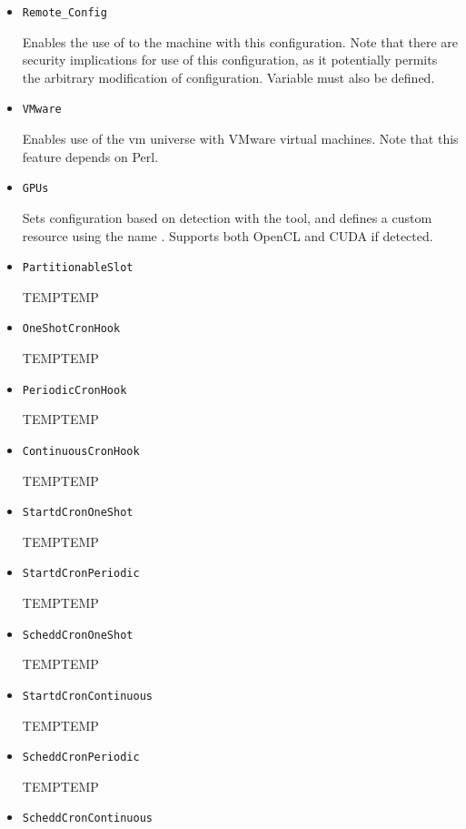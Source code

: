 \begin{description}
\begin{itemize}
    \item \texttt{Remote\_Config}

    Enables the use of   to the machine with
    this configuration.
    Note that there are security implications for use of this configuration,
    as it potentially permits the arbitrary modification of configuration.
    Variable  must also be defined.

    \item \texttt{VMware}

    Enables use of the vm universe with VMware virtual machines.
    Note that this feature depends on Perl. 

    \item \texttt{GPUs}

    Sets configuration based on detection with the 
    tool, and defines a custom resource using the name .
    Supports both OpenCL and CUDA if detected. 

    \item \texttt{PartitionableSlot}

	TEMPTEMP
	
    \item \texttt{OneShotCronHook}

	TEMPTEMP

    \item \texttt{PeriodicCronHook}

	TEMPTEMP

    \item \texttt{ContinuousCronHook}

	TEMPTEMP

    \item \texttt{StartdCronOneShot}

	TEMPTEMP

    \item \texttt{StartdCronPeriodic}

	TEMPTEMP

    \item \texttt{ScheddCronOneShot}

	TEMPTEMP

    \item \texttt{StartdCronContinuous}

	TEMPTEMP

    \item \texttt{ScheddCronPeriodic}

	TEMPTEMP

    \item \texttt{ScheddCronContinuous}


\end{itemize}
\end{description}
